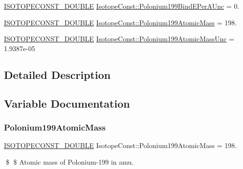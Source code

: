 \begin{DoxyCompactItemize}
\mbox{\hyperlink{group___isotope_const-_macros_ga8f45a7272ce02c0b4c65c44636ed719a}{I\+S\+O\+T\+O\+P\+E\+C\+O\+N\+S\+T\+\_\+\+D\+O\+U\+B\+LE}} \mbox{\hyperlink{group___isotope_const-_polonium-_po199_ga1eb1651c9e12c78719574f83cd7b001c}{Isotope\+Const\+::\+Polonium199\+Bind\+E\+Per\+A\+Unc}} = 0.
\item 
\mbox{\hyperlink{group___isotope_const-_macros_ga8f45a7272ce02c0b4c65c44636ed719a}{I\+S\+O\+T\+O\+P\+E\+C\+O\+N\+S\+T\+\_\+\+D\+O\+U\+B\+LE}} \mbox{\hyperlink{group___isotope_const-_polonium-_po199_ga7e39eb821114320fd52e78474b04cfe0}{Isotope\+Const\+::\+Polonium199\+Atomic\+Mass}} = 198.
\item 
\mbox{\hyperlink{group___isotope_const-_macros_ga8f45a7272ce02c0b4c65c44636ed719a}{I\+S\+O\+T\+O\+P\+E\+C\+O\+N\+S\+T\+\_\+\+D\+O\+U\+B\+LE}} \mbox{\hyperlink{group___isotope_const-_polonium-_po199_gafa35fd331cc674e5653d69b2ff410839}{Isotope\+Const\+::\+Polonium199\+Atomic\+Mass\+Unc}} = 1.\+9387e-\/05
\end{DoxyCompactItemize}


\subsection{Detailed Description}


\subsection{Variable Documentation}
\mbox{\label{group___isotope_const-_polonium-_po199_ga7e39eb821114320fd52e78474b04cfe0}} 
\subsubsection{\texorpdfstring{Polonium199\+Atomic\+Mass}{Polonium199AtomicMass}}
{\footnotesize\ttfamily \mbox{\hyperlink{group___isotope_const-_macros_ga8f45a7272ce02c0b4c65c44636ed719a}{I\+S\+O\+T\+O\+P\+E\+C\+O\+N\+S\+T\+\_\+\+D\+O\+U\+B\+LE}} Isotope\+Const\+::\+Polonium199\+Atomic\+Mass = 198.}

\$ \$ Atomic mass of Polonium-\/199 in amu. \mbox{\label{group___isotope_const-_polonium-_po199_gafa35fd331cc674e5653d69b2ff410839}} 
